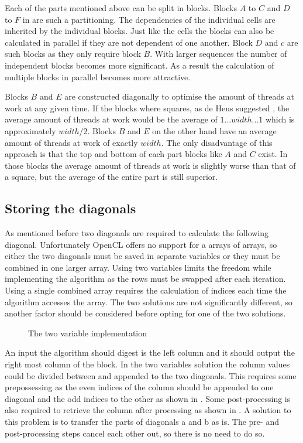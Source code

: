 Each of the parts mentioned above can be split in blocks.
Blocks $A$ to $C$ and $D$ to $F$ in  are such a partitioning.
The dependencies of the individual cells are inherited by the individual blocks.
Just like the cells the blocks can also be calculated in parallel if they are not dependent of one another.
Block $D$ and $c$ are such blocks as they only require block $B$.
With larger sequences the number of independent blocks becomes more significant.
As a result the calculation of multiple blocks in parallel becomes more attractive.

Blocks $B$ and $E$ are constructed diagonally to optimise the amount of threads at work at any given time.
If the blocks where squares, as de Heus suggested \cite{Heus}, the average amount of threads at work would be the average of $1...width...1$ which is approximately $width/2$.
Blocks $B$ and $E$ on the other hand have an average amount of threads at work of exactly $width$.
The only disadvantage of this approach is that the top and bottom of each part blocks like $A$ and $C$ exist.
In those blocks the average amount of threads at work is slightly worse than that of a square, but the average of the entire part is still superior.

\subsection{Storing the diagonals} \label{section:diagonal}
As mentioned before two diagonals are required to calculate the following diagonal.
Unfortunately OpenCL offers no support for a arrays of arrays, so either the two diagonals must be saved in separate variables or they must be combined in one larger array.
Using two variables limits the freedom while implementing the algorithm as the rows must be swapped after each iteration.
Using a single combined array requires the calculation of indices each time the algorithm accesses the array.
The two solutions are not significantly different, so another factor should be considered before opting for one of the two solutions.

\begin{figure}%
    \centering
    \subfloat[][Input]{\label{twovarsinput}}%
    \subfloat[][Output]{\label{twovarsoutput}}
    \caption{The two variable implementation} \label{twovars}
\end{figure}

An input the algorithm should digest is the left column and it should output the right most column of the block.
In the two variables solution the column values could be divided between and appended to the two diagonals.
This requires some prepossessing as the even indices of the column should be appended to one diagonal and the odd indices to the other as shown in .
Some post-processing is also required to retrieve the column after processing as shown in .
A solution to this problem is to transfer the parts of diagonals a and b as is.
The pre- and post-processing steps cancel each other out, so there is no need to do so.

